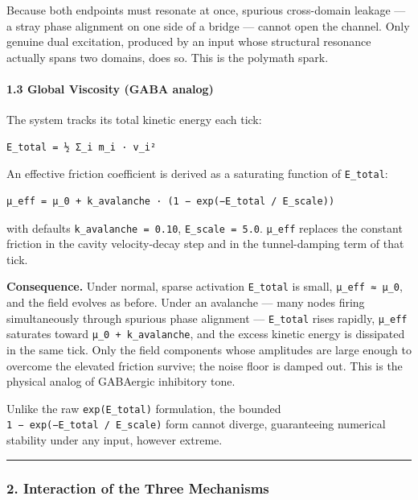 \documentclass[
  11pt,
  a4paper,
]{article}
\begin{document}
Because both endpoints must resonate at once, spurious cross-domain
leakage --- a stray phase alignment on one side of a bridge --- cannot
open the channel. Only genuine dual excitation, produced by an input
whose structural resonance actually spans two domains, does so. This is
the polymath spark.

\paragraph{1.3 Global Viscosity (GABA
analog)}\label{global-viscosity-gaba-analog}

The system tracks its total kinetic energy each tick:

\begin{verbatim}
E_total = ½ Σ_i m_i · v_i²
\end{verbatim}

An effective friction coefficient is derived as a saturating function of
\texttt{E\_total}:

\begin{verbatim}
μ_eff = μ_0 + k_avalanche · (1 − exp(−E_total / E_scale))
\end{verbatim}

with defaults \texttt{k\_avalanche\ =\ 0.10}, \texttt{E\_scale\ =\ 5.0}.
\texttt{μ\_eff} replaces the constant friction in the cavity
velocity-decay step and in the tunnel-damping term of that tick.

\textbf{Consequence.} Under normal, sparse activation \texttt{E\_total}
is small, \texttt{μ\_eff\ ≈\ μ\_0}, and the field evolves as before.
Under an avalanche --- many nodes firing simultaneously through spurious
phase alignment --- \texttt{E\_total} rises rapidly, \texttt{μ\_eff}
saturates toward \texttt{μ\_0\ +\ k\_avalanche}, and the excess kinetic
energy is dissipated in the same tick. Only the field components whose
amplitudes are large enough to overcome the elevated friction survive;
the noise floor is damped out. This is the physical analog of GABAergic
inhibitory tone.

Unlike the raw \texttt{exp(E\_total)} formulation, the bounded
\texttt{1\ −\ exp(−E\_total\ /\ E\_scale)} form cannot diverge,
guaranteeing numerical stability under any input, however extreme.

\begin{center}\rule{0.5\linewidth}{0.5pt}\end{center}

\subsubsection{2. Interaction of the Three
Mechanisms}\label{interaction-of-the-three-mechanisms}
\end{document}
